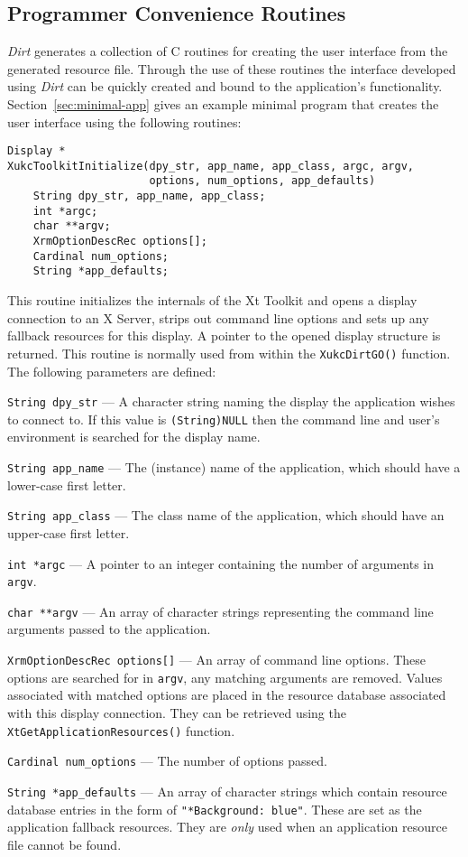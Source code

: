 \subsection{Programmer Convenience Routines}
\label{sec:convenience}
{\em Dirt} generates a collection of C routines for creating the user
interface from the generated resource file.  Through the use of these
routines the interface developed using {\em Dirt} can be quickly created
and bound to the application's functionality.  
Section~\ref{sec:minimal-app} gives an example minimal program that 
creates the user interface using the following routines:\begin{verbatim}
Display *
XukcToolkitInitialize(dpy_str, app_name, app_class, argc, argv,
                      options, num_options, app_defaults)
    String dpy_str, app_name, app_class;
    int *argc;
    char **argv;
    XrmOptionDescRec options[];
    Cardinal num_options;
    String *app_defaults;
\end{verbatim}
This routine initializes the internals of the Xt Toolkit and opens a 
display connection to an X Server, strips out command line options and 
sets up any fallback resources for this display.  A pointer to the 
opened display structure is returned.  This routine is normally used 
from within the {\tt XukcDirtGO()} function.  The following parameters 
are defined:\begin{description}
\item{\tt String dpy\_str} --- A character string naming the display the
application wishes to connect to.  If this value is
{\tt (String)NULL} then the command line and user's environment is searched
for the display name.
\item{\tt String app\_name} --- The (instance) name of the application, which
should have a lower-case first letter.
\item{\tt String app\_class} --- The class name of the application, which
should have an upper-case first letter.
\item{\tt int *argc} --- A pointer to an integer containing the number of
arguments in {\tt argv}.
\item{\tt char **argv} --- An array of character strings representing the
command line arguments passed to the application.
\item{\tt XrmOptionDescRec options[]} --- An array of command line options.
These options are searched for in {\tt argv}, any matching arguments are
removed.  Values associated with matched options are placed in the resource
database associated with this display connection.  They can be retrieved using
the {\tt XtGetApplicationResources()} function.
\item{\tt Cardinal num\_options} --- The number of options passed.
\item{\tt String *app\_defaults} --- An array of character strings which
contain resource database entries in the form of {\tt "*Background: blue"}.
These are set as the application fallback resources. They are {\em only} used
when an application resource file cannot be found.
\end{description}

